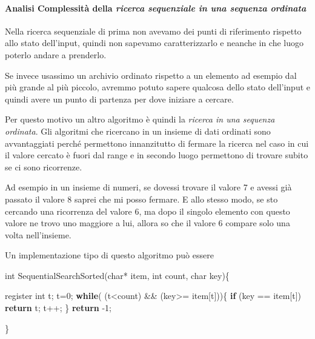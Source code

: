 \documentclass[
]{article}
\newenvironment{Shaded}{}{}
\newcommand{\AttributeTok}[1]{\textcolor[rgb]{0.49,0.56,0.16}{#1}}
\newcommand{\ControlFlowTok}[1]{\textcolor[rgb]{0.00,0.44,0.13}{\textbf{#1}}}
\newcommand{\DataTypeTok}[1]{\textcolor[rgb]{0.56,0.13,0.00}{#1}}
\newcommand{\DecValTok}[1]{\textcolor[rgb]{0.25,0.63,0.44}{#1}}
\newcommand{\NormalTok}[1]{#1}
\begin{document}
\hypertarget{header-n1541}{%
\paragraph{\texorpdfstring{Analisi Complessità della \emph{ricerca
sequenziale in una sequenza ordinata}
}{Analisi Complessità della ricerca sequenziale in una sequenza ordinata }}\label{header-n1541}}

Nella ricerca sequenziale di prima non avevamo dei punti di riferimento
rispetto allo stato dell'input, quindi non sapevamo caratterizzarlo e
neanche in che luogo poterlo andare a prenderlo.

Se invece usassimo un archivio ordinato rispetto a un elemento ad
esempio dal più grande al più piccolo, avremmo potuto sapere qualcosa
dello stato dell'input e quindi avere un punto di partenza per dove
iniziare a cercare.

Per questo motivo un altro algoritmo è quindi la \emph{ricerca in una
sequenza ordinata}. Gli algoritmi che ricercano in un insieme di dati
ordinati sono avvantaggiati perché permettono innanzitutto di fermare la
ricerca nel caso in cui il valore cercato è fuori dal range e in secondo
luogo permettono di trovare subito se ci sono ricorrenze.

Ad esempio in un insieme di numeri, se dovessi trovare il valore 7 e
avessi già passato il valore 8 saprei che mi posso fermare. E allo
stesso modo, se sto cercando una ricorrenza del valore 6, ma dopo il
singolo elemento con questo valore ne trovo uno maggiore a lui, allora
so che il valore 6 compare solo una volta nell'insieme.

Un implementazione tipo di questo algoritmo può essere

\begin{Shaded}
\begin{Highlighting}[]
\DataTypeTok{int}\NormalTok{ SequentialSearchSorted(}\DataTypeTok{char}\NormalTok{* item, }\DataTypeTok{int}\NormalTok{ count, }\DataTypeTok{char}\NormalTok{ key)\{}
	
    \AttributeTok{register} \DataTypeTok{int}\NormalTok{ t;}
\NormalTok{    t=}\DecValTok{0}\NormalTok{;}
    \ControlFlowTok{while}\NormalTok{( (t\textless{}count) \&\& (key\textgreater{}= item[t]))\{}
        \ControlFlowTok{if}\NormalTok{ (key == item[t]) }\ControlFlowTok{return}\NormalTok{ t;}
\NormalTok{        t++;}
\NormalTok{    \}}
    \ControlFlowTok{return}\NormalTok{ {-}}\DecValTok{1}\NormalTok{;}
    
\NormalTok{\}}
\end{Highlighting}
\end{Shaded}
\end{document}
